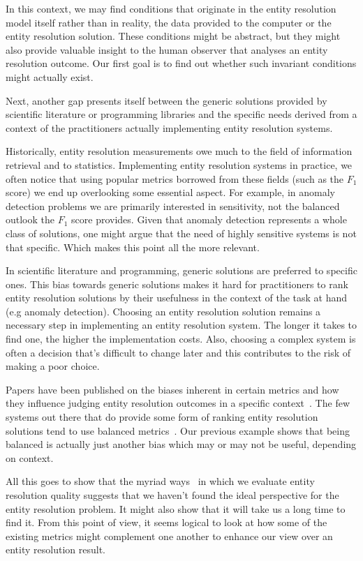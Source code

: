In this context, we may find conditions that originate in the entity resolution
model itself rather than in reality, the data provided to the computer or the
entity resolution solution.
These conditions might be abstract, but they might also provide valuable
insight to the human observer that analyses an entity resolution outcome.
Our first goal is to find out whether such invariant conditions might actually
exist.

Next, another gap presents itself between the generic solutions provided by
scientific literature or programming libraries and the specific needs derived
from a context of the practitioners actually implementing entity resolution
systems.

Historically, entity resolution measurements owe much to the field of
information retrieval and to statistics.
Implementing entity resolution systems in practice, we often notice that
using popular metrics borrowed from these fields (such as the $F_1$ score) we
end up overlooking some essential aspect.
For example, in anomaly detection problems we are primarily interested in
sensitivity, not the balanced outlook the $F_1$ score provides.
Given that anomaly detection represents a whole class of solutions, one might
argue that the need of highly sensitive systems is not that specific.
Which makes this point all the more relevant.

In scientific literature and programming, generic solutions are preferred to
specific ones.
This bias towards generic solutions makes it hard for practitioners to rank
entity resolution solutions by their usefulness in the context of the task
at hand (e.g anomaly detection).
Choosing an entity resolution solution remains a necessary step in
implementing an entity resolution system.
The longer it takes to find one, the higher the implementation costs.
Also, choosing a complex system is often a decision that's difficult to
change later and this contributes to the risk of making a poor choice.

Papers have been published on the biases inherent in certain metrics
and how they influence judging entity resolution outcomes in a specific
context~\cite{Goga2015}.
The few systems out there that do provide some form of ranking entity
resolution solutions tend to use balanced metrics~\cite{papwithcode2019}.
Our previous example shows that being balanced is actually just another bias
which may or may not be useful, depending on context.

All this goes to show that the myriad ways~\cite{hitesh2012} in which we
evaluate entity resolution quality suggests that we haven't found the ideal
perspective for the entity resolution problem.
It might also show that it will take us a long time to find it.
From this point of view, it seems logical to look at how some of the existing
metrics might complement one another to enhance our view over an entity
resolution result.

